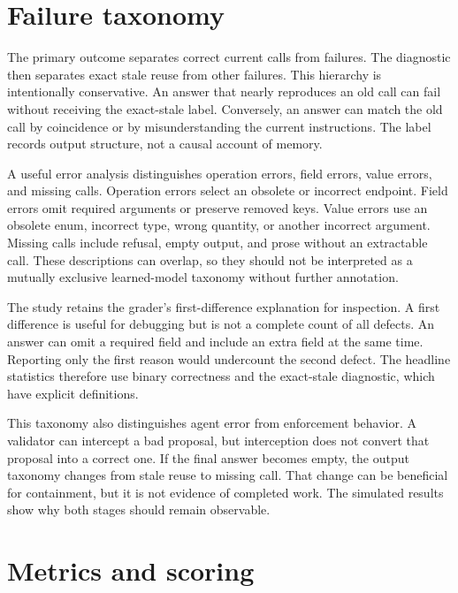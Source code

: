 \documentclass{article}
\begin{document}
\section{Failure taxonomy}
The primary outcome separates correct current calls from failures. The diagnostic then separates exact stale reuse from other failures. This hierarchy is intentionally conservative. An answer that nearly reproduces an old call can fail without receiving the exact-stale label. Conversely, an answer can match the old call by coincidence or by misunderstanding the current instructions. The label records output structure, not a causal account of memory.\par
A useful error analysis distinguishes operation errors, field errors, value errors, and missing calls. Operation errors select an obsolete or incorrect endpoint. Field errors omit required arguments or preserve removed keys. Value errors use an obsolete enum, incorrect type, wrong quantity, or another incorrect argument. Missing calls include refusal, empty output, and prose without an extractable call. These descriptions can overlap, so they should not be interpreted as a mutually exclusive learned-model taxonomy without further annotation.\par
The study retains the grader's first-difference explanation for inspection. A first difference is useful for debugging but is not a complete count of all defects. An answer can omit a required field and include an extra field at the same time. Reporting only the first reason would undercount the second defect. The headline statistics therefore use binary correctness and the exact-stale diagnostic, which have explicit definitions.\par
This taxonomy also distinguishes agent error from enforcement behavior. A validator can intercept a bad proposal, but interception does not convert that proposal into a correct one. If the final answer becomes empty, the output taxonomy changes from stale reuse to missing call. That change can be beneficial for containment, but it is not evidence of completed work. The simulated results show why both stages should remain observable.\par
\section{Metrics and scoring}
\end{document}
